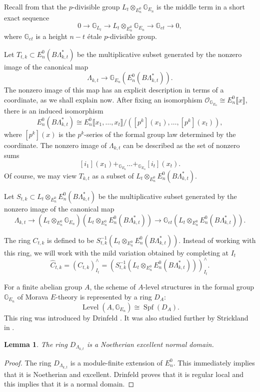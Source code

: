 \documentclass[oneside]{amsart}
\newtheorem{lem}[thm]{Lemma}
\theoremstyle{definition}
\theoremstyle{remark}
\theoremstyle{theorem}
\numberwithin{equation}{section}
\DeclareMathOperator{\Spf}{Spf}
\DeclareMathOperator{\Level}{Level}
\newcommand{\E}{E_{n}}
\newcommand{\lkt}{\Lambda_{k,t}}
\newcommand{\bG}{\mathbb{G}}
\begin{document}
Recall from \cite[Section 2]{stapleton_tgcm} that the $p$-divisible group $L_t \otimes_{\E^0} \bG_{E_n}$ is the middle term in a short exact sequence
\[
0 \rightarrow \bG_{L_t} \rightarrow L_t \otimes_{\E^0} \bG_{E_n} \rightarrow \bG_{et} \rightarrow 0,
\]
where $\bG_{et}$ is a height $n-t$ {\'e}tale $p$-divisible group.

Let $T_{t,k} \subset \E^0(B\lkt^*)$ be the multiplicative subset generated by the nonzero image of the canonical map
\[
\lkt \rightarrow \bG_{E_n}(\E^0(B\lkt^*)).
\]
The nonzero image of this map has an explicit description in terms of a coordinate, as we shall explain now. After fixing an isomorphism $\mathcal{O}_{\bG_{E_n}} \cong E_{n}^0\llbracket x \rrbracket$, there is an induced isomorphism
\[
\E^0(B\lkt^*) \cong \E^0\llbracket x_1, \ldots, x_t \rrbracket /([p^k](x_1), \ldots, [p^k](x_t)),
\]
where $[p^k](x)$ is the $p^k$-series of the formal group law determined by the coordinate. The nonzero image of $\lkt$ can be described as the set of nonzero sums
\[
[i_1](x_1) +_{\bG_{E_n}} \ldots +_{\bG_{E_n}} [i_t](x_t).
\]
Of course, we may view $T_{k,t}$ as a subset of $L_{t} \otimes_{\E^0} \E^0(B\lkt^*)$.

Let $S_{t,k} \subset L_{t} \otimes_{\E^0} \E^0(B\lkt^*)$ be the multiplicative subset generated by the nonzero image of the canonical map
\[
\lkt \rightarrow (L_t \otimes_{\E^0} \bG_{E_n})(L_{t} \otimes_{\E^0} \E^0(B\lkt^*)) \rightarrow \bG_{et}(L_{t} \otimes_{\E^0} \E^0(B\lkt^*)).
\]

The ring $C_{t,k}$ is defined to be $S_{t,k}^{-1}(L_{t} \otimes_{\E^0} \E^0(B\lkt^*))$. Instead of working with this ring, we will work with the mild variation obtained by completing at $I_t$
\[
\hat{C}_{t,k} = (C_{t,k})^{\wedge}_{I_t} = (S_{t,k}^{-1}(L_{t} \otimes_{\E^0} \E^0(B\lkt^*)))^{\wedge}_{I_t}.
\]

For a finite abelian group $A$, the scheme of $A$-level structures in the formal group $\bG_{E_n}$ of Morava $E$-theory is represented by a ring $D_A$:
\[
\Level(A,\bG_{E_n}) \cong \Spf(D_A).
\]
This ring was introduced by Drinfeld \cite{drinfeld_ell1}. It was also studied further by Strickland in \cite{strickland_finitesubgroups}.  

\begin{lem}
The ring $D_{\Lambda_{k,t}}$ is a Noetherian excellent normal domain.
\end{lem}
\begin{proof}
The ring $D_{\Lambda_{k,t}}$ is a module-finite extension of $\E^{0}$. This immediately implies that it is Noetherian and excellent. Drinfeld proves that it is regular local and this implies that it is a normal domain.
\end{proof}
\end{document}
